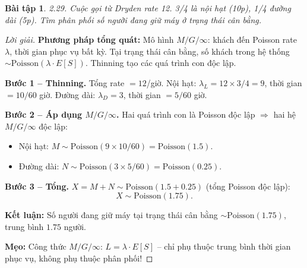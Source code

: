 \documentclass[8pt,a4paper]{article}
\newtheorem{exercise}{Bài tập}
\newenvironment{solution}{\begin{proof}[Lời giải]}{\end{proof}}
\begin{document}
\begin{exercise}
2.29. Cuộc gọi từ Dryden rate 12. 3/4 là nội hạt (10p), 1/4 đường dài (5p). Tìm phân phối số người đang giữ máy ở trạng thái cân bằng.
\end{exercise}
\begin{solution}
\textbf{Phương pháp tổng quát:} Mô hình $M/G/\infty$: khách đến Poisson rate $\lambda$, thời gian phục vụ bất kỳ. Tại trạng thái cân bằng, số khách trong hệ thống $\sim \text{Poisson}(\lambda \cdot E[S])$. Thinning tạo các quá trình con độc lập.

\textbf{Bước 1 -- Thinning.} Tổng rate $= 12$/giờ. Nội hạt: $\lambda_L = 12 \times 3/4 = 9$, thời gian $= 10/60$ giờ. Đường dài: $\lambda_D = 3$, thời gian $= 5/60$ giờ.

\textbf{Bước 2 -- Áp dụng $M/G/\infty$.} Hai quá trình con là Poisson độc lập $\Rightarrow$ hai hệ $M/G/\infty$ độc lập:
\begin{itemize}[nosep]
  \item Nội hạt: $M \sim \text{Poisson}(9 \times 10/60) = \text{Poisson}(1.5)$.
  \item Đường dài: $N \sim \text{Poisson}(3 \times 5/60) = \text{Poisson}(0.25)$.
\end{itemize}

\textbf{Bước 3 -- Tổng.} $X = M + N \sim \text{Poisson}(1.5 + 0.25)$ (tổng Poisson độc lập):
\[
  \boxed{X \sim \text{Poisson}(1.75)}.
\]

\textbf{Kết luận:} Số người đang giữ máy tại trạng thái cân bằng $\sim \text{Poisson}(1.75)$, trung bình $1.75$ người.

\textbf{Mẹo:} Công thức $M/G/\infty$: $L = \lambda \cdot E[S]$ -- chỉ phụ thuộc trung bình thời gian phục vụ, không phụ thuộc phân phối!
\end{solution}
\end{document}
